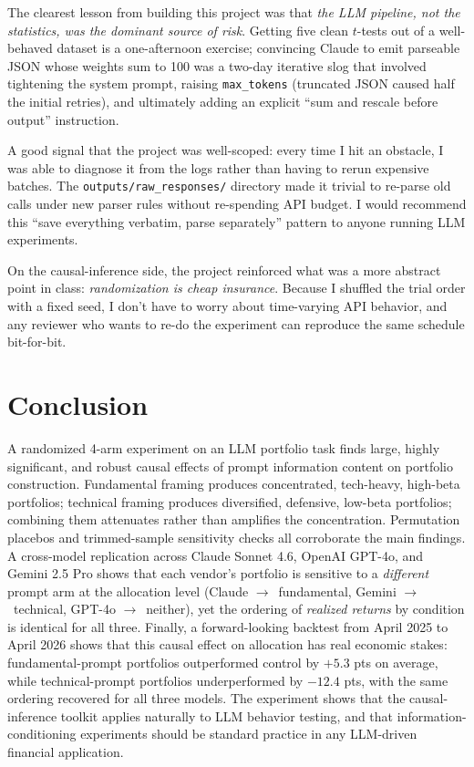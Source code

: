 \documentclass[11pt]{article}
\begin{document}
The clearest lesson from building this project was that \emph{the LLM
pipeline, not the statistics, was the dominant source of risk}. Getting
five clean $t$-tests out of a well-behaved dataset is a one-afternoon
exercise; convincing Claude to emit parseable JSON whose weights sum to
100 was a two-day iterative slog that involved tightening the system
prompt, raising \texttt{max\_tokens} (truncated JSON caused half the
initial retries), and ultimately adding an explicit ``sum and rescale
before output'' instruction.

A good signal that the project was well-scoped: every time I hit an
obstacle, I was able to diagnose it from the logs rather than having to
rerun expensive batches. The \texttt{outputs/raw\_responses/} directory
made it trivial to re-parse old calls under new parser rules without
re-spending API budget. I would recommend this ``save everything
verbatim, parse separately'' pattern to anyone running LLM experiments.

On the causal-inference side, the project reinforced what was a more
abstract point in class: \emph{randomization is cheap insurance}. Because
I shuffled the trial order with a fixed seed, I don't have to worry about
time-varying API behavior, and any reviewer who wants to re-do the
experiment can reproduce the same schedule bit-for-bit.

\section{Conclusion}

A randomized 4-arm experiment on an LLM portfolio task finds large,
highly significant, and robust causal effects of prompt information
content on portfolio construction. Fundamental framing produces
concentrated, tech-heavy, high-beta portfolios; technical framing produces
diversified, defensive, low-beta portfolios; combining them attenuates
rather than amplifies the concentration. Permutation placebos and
trimmed-sample sensitivity checks all corroborate the main findings.
A cross-model replication across Claude Sonnet 4.6, OpenAI GPT-4o, and
Gemini 2.5 Pro shows that each vendor's portfolio is sensitive to a
\emph{different} prompt arm at the allocation level (Claude
$\to$~fundamental, Gemini $\to$~technical, GPT-4o $\to$~neither), yet
the ordering of \emph{realized returns} by condition is identical for
all three. Finally, a forward-looking backtest
from April 2025 to April 2026 shows that this causal effect on allocation
has real economic stakes: fundamental-prompt portfolios outperformed
control by $+5.3$ pts on average, while technical-prompt portfolios
underperformed by $-12.4$ pts, with the same ordering recovered for all
three models. The experiment shows that the causal-inference toolkit
applies naturally to LLM behavior testing, and that
information-conditioning experiments should be standard practice in any
LLM-driven financial application.
\end{document}

